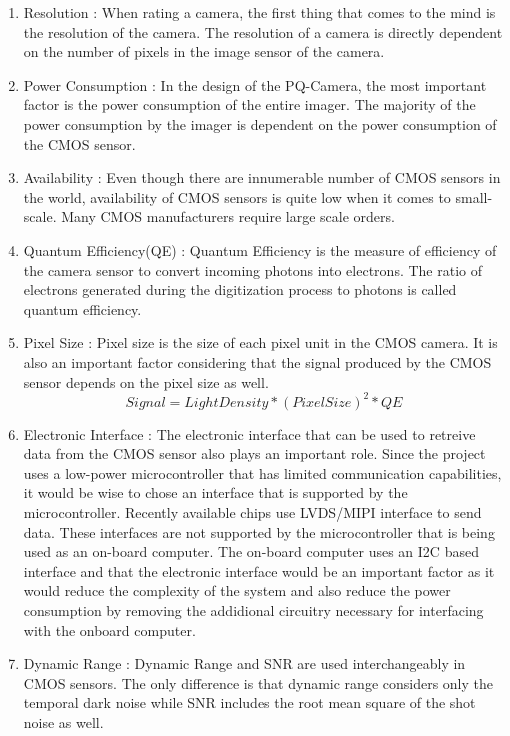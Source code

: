 \begin{enumerate}
\item Resolution : When rating a camera, the first thing that comes to the mind is the resolution of the camera. The resolution of a camera is directly dependent on the number of pixels in the image sensor of the camera. 
\item Power Consumption : In the design of the PQ-Camera, the most important factor is the power consumption of the entire imager. The majority of the power consumption by the imager is dependent on the power consumption of the CMOS sensor. 
\item Availability : Even though there are innumerable number of CMOS sensors in the world, availability of CMOS sensors is quite low when it comes to small-scale. Many CMOS manufacturers require large scale orders.
\item Quantum Efficiency(QE) : Quantum Efficiency is the measure of efficiency of the camera sensor to convert incoming photons into electrons. The ratio of electrons generated during the digitization process to photons is called quantum efficiency.
\item Pixel Size : Pixel size is the size of each pixel unit in the CMOS camera. It is also an important factor considering that the signal produced by the CMOS sensor depends on the pixel size as well.
$$
Signal = Light Density * (Pixel Size)^2 * QE
$$
\item Electronic Interface : The electronic interface that can be used to retreive data from the CMOS sensor also plays an important role. Since the project uses a low-power microcontroller that has limited communication capabilities, it would be wise to chose an interface that is supported by the microcontroller. Recently available chips use LVDS/MIPI interface to send data. These interfaces are not supported by the microcontroller that is being used as an on-board computer. The on-board computer uses an I2C based interface and that the electronic interface would be an important factor as it would reduce the complexity of the system and also reduce the power consumption by removing the addidional circuitry necessary for interfacing with the onboard computer.

\item Dynamic Range : Dynamic Range and SNR are used interchangeably in CMOS sensors. The only difference is that dynamic range considers only the temporal dark noise while SNR includes the root mean square of the shot noise as well.  


\end{enumerate}
